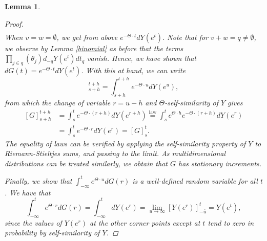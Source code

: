 \documentclass[english, a4paper, 12pt,reqno]{amsart}
\newtheorem{lemma}[defi]{Lemma}
\begin{document}
\begin{lemma}
\begin{proof}
\begin{equation*}
\begin{split}
\end{split}
\end{equation*}
When $v=w=\emptyset$, we get from above $e^{-\Theta\cdot t} dY(e^t)$. Note that for $v+w =q \neq \emptyset$, we observe by Lemma \ref{binomial} as before that the terms  $\prod_{j\in q} (\theta_j) d_{-q} Y(e^t) dt_q$ vanish.
Hence, we have shown that $dG(t) = e^{-\Theta\cdot t} dY(e^t)$. With this at hand, we can write
\begin{equation*}
 [G]_{s+h}^{t+h} = \int_{s+h}^{t+h} e^{-\Theta\cdot u} dY(e^u),
\end{equation*}
from which the change of variable $r = u-h$ and $\Theta$-self-similarity of $Y$ gives
\begin{equation*}
\begin{split}
 [G]_{s+h}^{t+h}&= \int_{s}^{t} e^{-\Theta\cdot (r+h)} dY(e^{r+h}) \overset{\text{law}}{=}  \int_{s}^{t} e^{\Theta\cdot h}e^{-\Theta\cdot (r+h)} dY(e^r)\\
 &= \int_{s}^{t}e^{-\Theta\cdot r} dY(e^r) = [G]_s^t.
\end{split}
\end{equation*}
The equality of laws can be verified by applying the self-similarity property of $Y$ to Riemann-Stieltjes sums, and passing to the limit. As multidimensional distributions can be treated similarly, we obtain that $G$ has stationary increments.

Finally, we show that 
$\int_{-\infty}^{t} e^{\Theta\cdot u} dG(r)$ is a well-defined random variable for all $t$. We have that
\begin{equation}
\label{sidedinverse}
 \int_{-\infty}^{t} e^{\Theta\cdot r} dG(r) =  \int_{-\infty}^{t}  dY(e^r) = \lim_{u\to\infty}[Y(e^r)]_{-\bar{u}}^t= Y(e^t),
 \end{equation}
since the values of $Y(e^r)$ at the other corner points except at $t$ tend to zero in probability by self-similarity of $Y$.
\end{proof}
\end{lemma}
\end{document}
